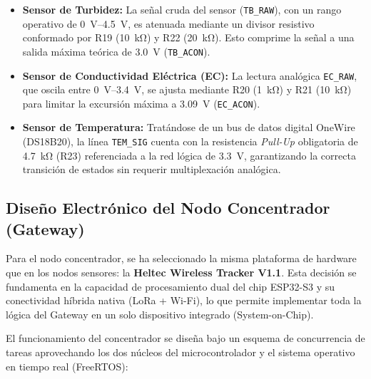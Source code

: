 \begin{itemize}
  \item \textbf{Sensor de Turbidez:} La señal cruda del sensor (\texttt{TB\_RAW}), con un rango operativo de \SIrange{0}{4.5}{\volt}, es atenuada mediante un divisor resistivo conformado por R19 (\SI{10}{\kilo\ohm}) y R22 (\SI{20}{\kilo\ohm}). Esto comprime la señal a una salida máxima teórica de \SI{3.0}{\volt} (\texttt{TB\_ACON}).
  \item \textbf{Sensor de Conductividad Eléctrica (EC):} La lectura analógica \texttt{EC\_RAW}, que oscila entre \SIrange{0}{3.4}{\volt}, se ajusta mediante R20 (\SI{1}{\kilo\ohm}) y R21 (\SI{10}{\kilo\ohm}) para limitar la excursión máxima a \SI{3.09}{\volt} (\texttt{EC\_ACON}).
  \item \textbf{Sensor de Temperatura:} Tratándose de un bus de datos digital OneWire (DS18B20), la línea \texttt{TEM\_SIG} cuenta con la resistencia \textit{Pull-Up} obligatoria de \SI{4.7}{\kilo\ohm} (R23) referenciada a la red lógica de \SI{3.3}{\volt}, garantizando la correcta transición de estados sin requerir multiplexación analógica.
\end{itemize}

\subsection{Diseño Electrónico del Nodo Concentrador (Gateway)}
\label{subsec:diseno_gateway}

Para el nodo concentrador, se ha seleccionado la misma plataforma de hardware que en los nodos sensores: la \textbf{Heltec Wireless Tracker V1.1}. Esta decisión se fundamenta en la capacidad de procesamiento dual del chip ESP32-S3 y su conectividad híbrida nativa (LoRa + Wi-Fi), lo que permite implementar toda la lógica del Gateway en un solo dispositivo integrado (System-on-Chip).

El funcionamiento del concentrador se diseña bajo un esquema de concurrencia de tareas aprovechando los dos núcleos del microcontrolador y el sistema operativo en tiempo real (FreeRTOS):

